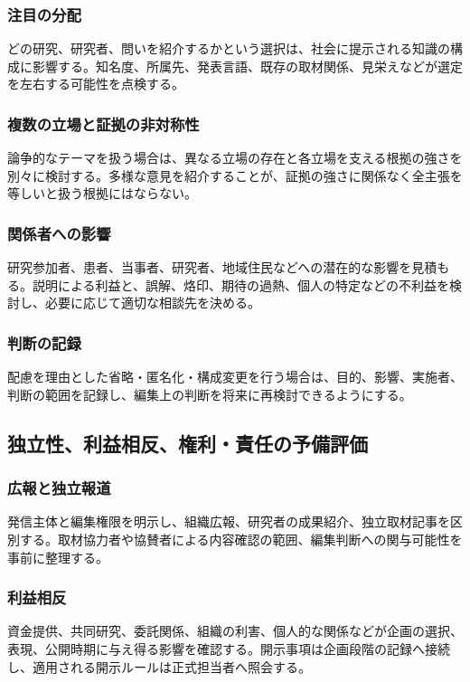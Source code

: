 \documentclass[a4paper,11pt]{article}
\begin{document}
\subsubsection{注目の分配}
\par どの研究、研究者、問いを紹介するかという選択は、社会に提示される知識の構成に影響する。知名度、所属先、発表言語、既存の取材関係、見栄えなどが選定を左右する可能性を点検する。\par\medskip
\subsubsection{複数の立場と証拠の非対称性}
\par 論争的なテーマを扱う場合は、異なる立場の存在と各立場を支える根拠の強さを別々に検討する。多様な意見を紹介することが、証拠の強さに関係なく全主張を等しいと扱う根拠にはならない。\par\medskip
\subsubsection{関係者への影響}
\par 研究参加者、患者、当事者、研究者、地域住民などへの潜在的な影響を見積もる。説明による利益と、誤解、烙印、期待の過熱、個人の特定などの不利益を検討し、必要に応じて適切な相談先を決める。\par\medskip
\subsubsection{判断の記録}
\par 配慮を理由とした省略・匿名化・構成変更を行う場合は、目的、影響、実施者、判断の範囲を記録し、編集上の判断を将来に再検討できるようにする。\par\medskip
\subsection{独立性、利益相反、権利・責任の予備評価}
\subsubsection{広報と独立報道}
\par 発信主体と編集権限を明示し、組織広報、研究者の成果紹介、独立取材記事を区別する。取材協力者や協賛者による内容確認の範囲、編集判断への関与可能性を事前に整理する。\par\medskip
\subsubsection{利益相反}
\par 資金提供、共同研究、委託関係、組織の利害、個人的な関係などが企画の選択、表現、公開時期に与え得る影響を確認する。開示事項は企画段階の記録へ接続し、適用される開示ルールは正式担当者へ照会する。\par\medskip
\end{document}
